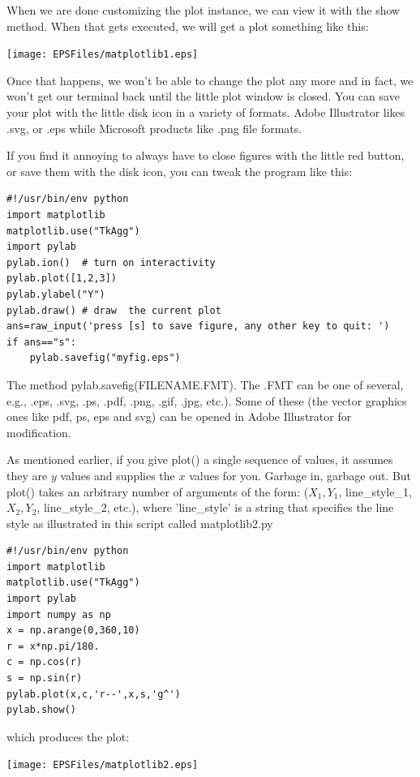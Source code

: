 \documentclass[11pt]{book}
\begin{document}
{{{{When we are done customizing the plot instance, we can view it with the {\color{blue}show} method.  When that gets executed, we will get a plot something like this:

   \texttt{[image: EPSFiles/matplotlib1.eps]}

   \noindent Once that happens, we won't be able to change the plot any more and in fact, we won't get our terminal back until the little plot window is closed.   You can save your plot with the little disk icon in a variety of formats.  Adobe Illustrator likes .svg, or .eps while Microsoft products like .png file formats.

If you find it annoying to always have to close figures with the little red button, or save them with the disk icon, you can tweak the program like this:

{ \color{blue}\begin{verbatim}
#!/usr/bin/env python
import matplotlib
matplotlib.use("TkAgg")
import pylab
pylab.ion()  # turn on interactivity
pylab.plot([1,2,3])
pylab.ylabel("Y")
pylab.draw() # draw  the current plot
ans=raw_input('press [s] to save figure, any other key to quit: ')
if ans=="s":
    pylab.savefig("myfig.eps")
\end{verbatim}}

\noindent The method {\color{blue}pylab.savefig(FILENAME.FMT)}.  The .FMT can be one of several, e.g., .eps, .svg, .ps, .pdf, .png, .gif, .jpg, etc.).   Some of these (the vector graphics ones like pdf,  ps, eps and svg) can be opened in Adobe Illustrator for modification.


As mentioned earlier, if  you give {\color{blue}plot()} a single sequence of values, it assumes they are $y$ values and supplies the $x$ values for you.  Garbage in, garbage out.  But
 {\color{blue}plot()} takes an arbitrary number of arguments of the form: ($X_1, Y_1$, line\_style\_1, $X_2, Y_2$, line\_style\_2,  etc.),
 where 'line\_style' is a string that specifies the line style as illustrated in this script called {\color{blue}matplotlib2.py}


{ \color{blue} \begin{verbatim}
#!/usr/bin/env python
import matplotlib
matplotlib.use("TkAgg")
import pylab
import numpy as np
x = np.arange(0,360,10)
r = x*np.pi/180.
c = np.cos(r)
s = np.sin(r)
pylab.plot(x,c,'r--',x,s,'g^')
pylab.show()
\end{verbatim}}

\noindent which produces the plot:

\texttt{[image: EPSFiles/matplotlib2.eps]}

}}}}
\end{document}
